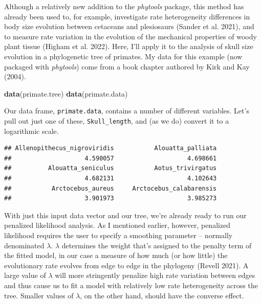 \documentclass[fleqn,10pt,lineno]{wlpeerj} %
\newenvironment{Shaded}{\begin{snugshade}}{\end{snugshade}}
\newcommand{\FunctionTok}[1]{\textcolor[rgb]{0.13,0.29,0.53}{\textbf{#1}}}
\newcommand{\NormalTok}[1]{#1}
\newcommand{\OtherTok}[1]{\textcolor[rgb]{0.56,0.35,0.01}{#1}}
\newcommand{\SpecialCharTok}[1]{\textcolor[rgb]{0.81,0.36,0.00}{\textbf{#1}}}
\begin{document}
Although a relatively new addition to the \emph{phytools} package, this method has already been used to, for example, investigate rate heterogeneity differences in body size evolution between cetaceans and plesiosaurs (Sander et al. 2021), and to measure rate variation in the evolution of the mechanical properties of woody plant tissue (Higham et al. 2022). Here, I'll apply it to the analysis of skull size evolution in a phylogenetic tree of primates. My data for this example (now packaged with \emph{phytools}) come from a book chapter authored by Kirk and Kay (2004).

\begin{Shaded}
\begin{Highlighting}[]
\FunctionTok{data}\NormalTok{(primate.tree)}
\FunctionTok{data}\NormalTok{(primate.data)}
\end{Highlighting}
\end{Shaded}

Our data frame, \texttt{primate.data}, contains a number of different variables. Let's pull out just one of these, \texttt{Skull\_length}, and (as we do) convert it to a logarithmic scale.

\begin{Shaded}
\end{Shaded}

\begin{verbatim}
## Allenopithecus_nigroviridis           Alouatta_palliata 
##                    4.590057                    4.698661 
##          Alouatta_seniculus           Aotus_trivirgatus 
##                    4.682131                    4.102643 
##           Arctocebus_aureus     Arctocebus_calabarensis 
##                    3.901973                    3.985273
\end{verbatim}

With just this input data vector and our tree, we're already ready to run our penalized likelihood analysis. As I mentioned earlier, however, penalized likelihood requires the user to specify a smoothing parameter -- normally denominated \(\lambda\). \(\lambda\) determines the weight that's assigned to the penalty term of the fitted model, in our case a measure of how much (or how little) the evolutionary rate evolves from edge to edge in the phylogeny (Revell 2021). A large value of \(\lambda\) will more stringently penalize high rate variation between edges and thus cause us to fit a model with relatively low rate heterogeneity across the tree. Smaller values of \(\lambda\), on the other hand, should have the converse effect.
\end{document}
